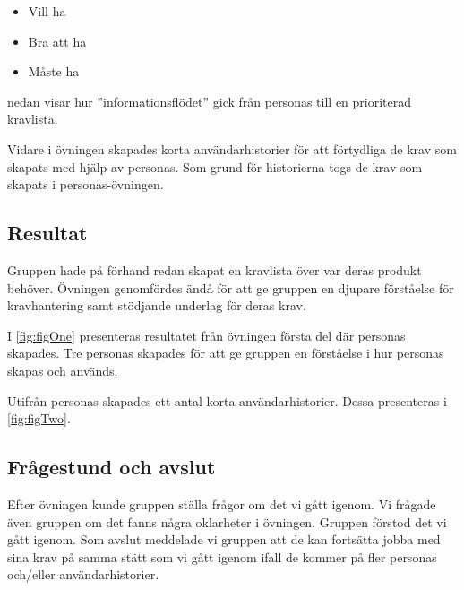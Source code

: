 \begin{itemize}
    \item Vill ha
    \item Bra att ha
    \item Måste ha
\end{itemize}

 nedan visar hur ''informationsflödet'' gick från personas till en prioriterad kravlista.


\bigskip

Vidare i övningen skapades korta användarhistorier för att förtydliga de krav som skapats med hjälp av personas. Som grund för historierna togs de krav som skapats i personas-övningen.


\subsection{Resultat}
Gruppen hade på förhand redan skapat en kravlista över var deras produkt behöver. Övningen genomfördes ändå för att ge gruppen en djupare förståelse för kravhantering samt stödjande underlag för deras krav.


\bigskip

I \cref{fig:figOne} presenteras resultatet från övningen första del där personas skapades. Tre personas skapades för att ge gruppen en förståelse i hur personas skapas och används.


Utifrån personas skapades ett antal korta användarhistorier. Dessa presenteras i \cref{fig:figTwo}.


\subsection{Frågestund och avslut}
Efter övningen kunde gruppen ställa frågor om det vi gått igenom. Vi frågade även gruppen om det fanns några oklarheter i övningen. Gruppen förstod det vi gått igenom. Som avslut meddelade vi gruppen att de kan fortsätta jobba med sina krav på samma stätt som vi gått igenom ifall de kommer på fler personas och/eller användarhistorier.
